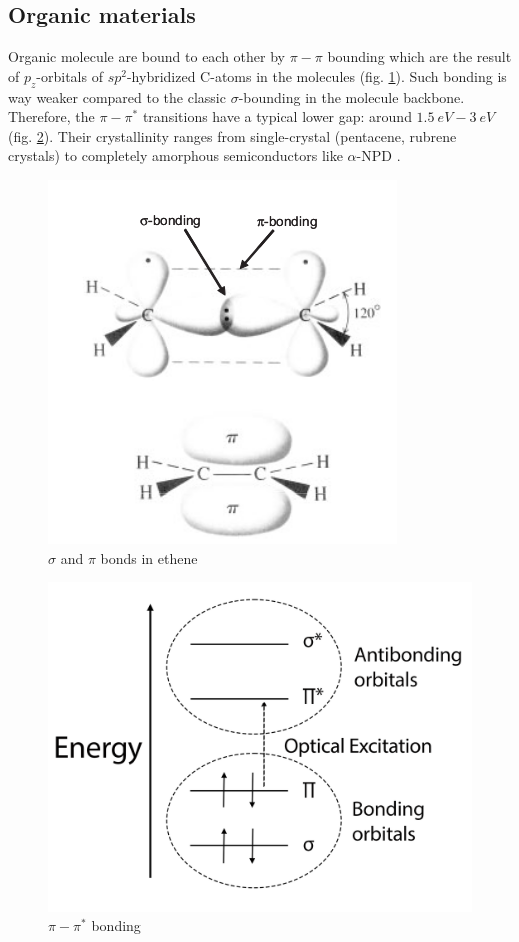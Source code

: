 \subsection{Organic materials}

Organic molecule are bound to each other by $\pi - \pi$ bounding which are the result of $p_z$-orbitals of $sp^2$-hybridized C-atoms in the molecules (fig. \ref{fig:2}). Such bonding is way weaker compared to the classic $\sigma$-bounding in the molecule backbone. Therefore, the $\pi-\pi^*$ transitions have a typical lower gap: around $\SI{1.5}{eV}-\SI{3}{eV}$ (fig. \ref{fig:3}). Their crystallinity ranges from single-crystal (pentacene, rubrene crystals) \cite{mono_crystal} to completely amorphous semiconductors like $\alpha$-NPD \cite{amorphous}.

\begin{figure}
    \centering
    \includegraphics*[width=0.4\paperwidth]{figures/pi_bonding.png}
    \caption{$\sigma$ and $\pi$ bonds in ethene \label{fig:2} \cite{intro_orga}}
\end{figure}

\begin{figure}
    \centering
    \includegraphics*[width=0.4\paperwidth]{figures/pi_pistar.png}
    \caption{$\pi-\pi^*$ bonding \label{fig:3} \cite{intro_orga}}
\end{figure}


